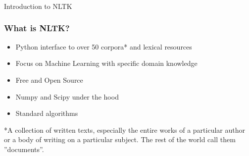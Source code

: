 
\begin{frame}[fragile]\frametitle{}

\begin{center}
{\Large Introduction to NLTK}
\end{center}
\end{frame}
%

\begin{frame}[fragile]\frametitle{What is NLTK?}
  \begin{itemize}
    \item Python interface to over 50 corpora* and lexical resources
    \item Focus on Machine Learning with specific domain knowledge
    \item Free and Open Source
    \item Numpy and Scipy under the hood
    \item Standard algorithms
  \end{itemize}
*A collection of written texts, especially the entire works of a particular author or a body of writing on a particular subject. The rest of the world call them ''documents''.
\end{frame}

